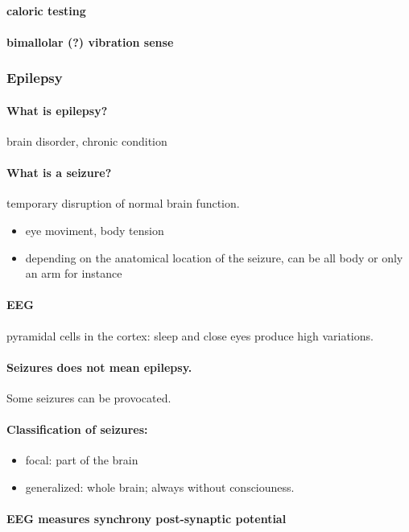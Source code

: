 \documentclass[12pt,article,oneside,a4paper]{memoir}
\begin{document}
\paragraph{caloric testing}
\paragraph{bimallolar (?) vibration sense}

\subsubsection{Epilepsy}
\paragraph{What is epilepsy?} brain disorder, chronic condition
\paragraph{What is a seizure?} temporary disruption of normal brain function.
\begin{itemize}
\item eye moviment, body tension
\item depending on the anatomical location of the seizure, can be all body or only an arm for instance
\end{itemize}
\paragraph{EEG} pyramidal cells in the cortex: sleep and close eyes produce high variations.
\paragraph{Seizures does not mean epilepsy.} Some seizures can be provocated.

\paragraph{Classification of seizures:}
\begin{itemize}
\item focal: part of the brain
\item generalized: whole brain; always without consciouness.
\end{itemize}

\paragraph{EEG measures synchrony post-synaptic potential}
\end{document}
